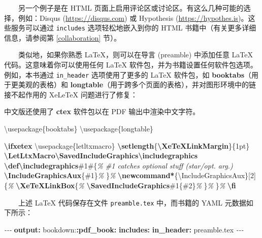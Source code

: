 \documentclass[
  12pt,
]{krantz}
\newenvironment{Shaded}{\begin{snugshade}}{\end{snugshade}}
\newcommand{\AttributeTok}[1]{\textcolor[rgb]{0.13,0.29,0.53}{#1}}
\newcommand{\BuiltInTok}[1]{#1}
\newcommand{\CommentTok}[1]{\textcolor[rgb]{0.56,0.35,0.01}{\textit{#1}}}
\newcommand{\ExtensionTok}[1]{#1}
\newcommand{\FunctionTok}[1]{\textcolor[rgb]{0.13,0.29,0.53}{\textbf{#1}}}
\newcommand{\KeywordTok}[1]{\textcolor[rgb]{0.13,0.29,0.53}{\textbf{#1}}}
\newcommand{\NormalTok}[1]{#1}
\newcommand{\PreprocessorTok}[1]{\textcolor[rgb]{0.56,0.35,0.01}{\textit{#1}}}
\renewenvironment{quote}{\begin{VF}}{\end{VF}}
\theoremstyle{definition}
\theoremstyle{definition}
\theoremstyle{definition}
\theoremstyle{definition}
\theoremstyle{remark}
\begin{document}
  另一个例子是在 HTML 页面上启用评论区或讨论区。有这么几种可能的选择，例如：Disqus (\url{https://disqus.com}) 或 Hypothesis (\url{https://hypothes.is})。这些服务可以通过 \texttt{includes} 选项轻松地嵌入到你的 HTML 书籍中（有关更多详细信息，请参阅第 \ref{collaboration} 节）。

  类似地，如果你熟悉 LaTeX，则可以在导言 (preamble) 中添加任意 LaTeX 代码。这意味着你可以使用任何 LaTeX 软件包，并为书籍设置任何软件包选项。例如，本书通过 \texttt{in\_header} 选项使用了更多的 LaTeX 软件包，如 \textbf{booktabs}（用于更美观的表格）和 \textbf{longtable}（用于跨多个页面的表格），并对图形环境中的链接不起作用的 XeLeTeX 问题进行了修复：

\begin{quote}
中文版还使用了 \textbf{ctex} 软件包以在 PDF 输出中渲染中文字符。
\end{quote}

\begin{Shaded}
\begin{Highlighting}[]
\BuiltInTok{\textbackslash{}usepackage}\NormalTok{\{}\ExtensionTok{booktabs}\NormalTok{\}}
\BuiltInTok{\textbackslash{}usepackage}\NormalTok{\{}\ExtensionTok{longtable}\NormalTok{\}}

\FunctionTok{\textbackslash{}ifxetex}
  \BuiltInTok{\textbackslash{}usepackage}\NormalTok{\{}\ExtensionTok{letltxmacro}\NormalTok{\}}
  \FunctionTok{\textbackslash{}setlength}\NormalTok{\{}\FunctionTok{\textbackslash{}XeTeXLinkMargin}\NormalTok{\}\{1pt\}}
  \FunctionTok{\textbackslash{}LetLtxMacro\textbackslash{}SavedIncludeGraphics\textbackslash{}includegraphics}
  \FunctionTok{\textbackslash{}def\textbackslash{}includegraphics}\NormalTok{\#1\#\{}\CommentTok{\% \#1 catches optional stuff (star/opt. arg.)}
    \FunctionTok{\textbackslash{}IncludeGraphicsAux}\NormalTok{\{\#1\}}\CommentTok{\%}
\NormalTok{  \}}\CommentTok{\%}
  \FunctionTok{\textbackslash{}newcommand*}\NormalTok{\{}\ExtensionTok{\textbackslash{}IncludeGraphicsAux}\NormalTok{\}[2]\{}\CommentTok{\%}
    \FunctionTok{\textbackslash{}XeTeXLinkBox}\NormalTok{\{}\CommentTok{\%}
      \FunctionTok{\textbackslash{}SavedIncludeGraphics}\NormalTok{\#1\{\#2\}}\CommentTok{\%}
\NormalTok{    \}}\CommentTok{\%}
\NormalTok{  \}}\CommentTok{\%}
\FunctionTok{\textbackslash{}fi}
\end{Highlighting}
\end{Shaded}

  上述 LaTeX 代码保存在文件 \texttt{preamble.tex} 中，而书籍的 YAML 元数据如下所示：

\begin{Shaded}
\begin{Highlighting}[]
\PreprocessorTok{{-}{-}{-}}
\FunctionTok{output}\KeywordTok{:}
\AttributeTok{  bookdown:}\FunctionTok{:pdf\_book}\KeywordTok{:}
\AttributeTok{    }\FunctionTok{includes}\KeywordTok{:}
\AttributeTok{      }\FunctionTok{in\_header}\KeywordTok{:}\AttributeTok{ preamble.tex}
\PreprocessorTok{{-}{-}{-}}
\end{Highlighting}
\end{Shaded}
\end{document}
